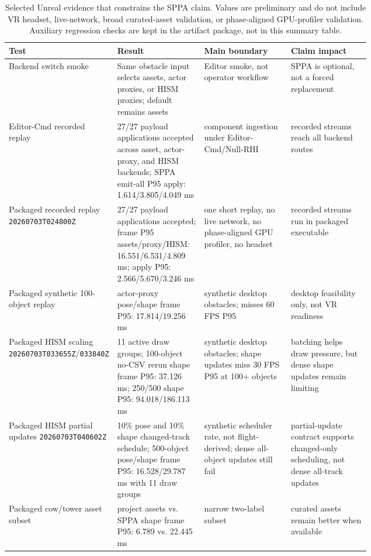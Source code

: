 \documentclass[10pt]{article}
\begin{document}
\begin{table}[H]
\centering
\scriptsize
\setlength{\tabcolsep}{3pt}
\renewcommand{\arraystretch}{1.0}
\caption{Selected Unreal evidence that constrains the SPPA claim. Values are
preliminary and do not include VR headset, live-network, broad curated-asset
validation, or phase-aligned GPU-profiler validation. Auxiliary regression checks are kept in the
artifact package, not in this summary table.}
\label{tab:unreal-selected}
\begin{tabularx}{\linewidth}{@{}L{0.26\linewidth}Y L{0.24\linewidth}L{0.22\linewidth}@{}}
\toprule
Test & Result & Main boundary & Claim impact \\
\midrule
Backend switch smoke & Same obstacle input selects assets, actor proxies, or
HISM proxies; default remains assets & Editor smoke, not operator workflow &
SPPA is optional, not a forced replacement \\
Editor-Cmd recorded replay & 27/27 payload applications accepted across
asset, actor-proxy, and HISM backends; SPPA emit-all P95 apply:
1.614/3.805/4.049 ms & component ingestion under Editor-Cmd/Null-RHI & recorded
streams reach all backend routes \\
Packaged recorded replay \texttt{20260703T024800Z} & 27/27 payload
applications accepted; frame P95 assets/proxy/HISM: 16.551/6.531/4.809 ms;
apply P95: 2.566/5.670/3.246 ms & one short replay, no live network, no
phase-aligned GPU profiler, no headset & recorded streams run in packaged executable \\
Packaged synthetic 100-object replay & actor-proxy pose/shape frame P95:
17.814/19.256 ms & synthetic desktop obstacles; misses 60 FPS P95 & desktop
feasibility only, not VR readiness \\
Packaged HISM scaling \texttt{20260703T033655Z}/\texttt{033840Z} & 11 active
draw groups; 100-object no-CSV rerun shape frame P95: 37.126 ms; 250/500 shape
P95: 94.018/186.113 ms & synthetic desktop obstacles; shape updates miss 30 FPS
P95 at 100+ objects & batching helps draw pressure, but dense shape updates
remain limiting \\
Packaged HISM partial updates \texttt{20260703T040602Z} & 10\% pose and 10\%
shape changed-track schedule; 500-object pose/shape frame P95:
16.528/29.787 ms with 11 draw groups & synthetic scheduler rate, not
flight-derived; dense all-object updates still fail & partial-update contract
supports changed-only scheduling, not dense all-track updates \\
Packaged cow/tower asset subset & project assets vs. SPPA shape frame P95:
6.789 vs. 22.445 ms & narrow two-label subset & curated assets remain better
when available \\
\bottomrule
\end{tabularx}
\end{table}
\end{document}

